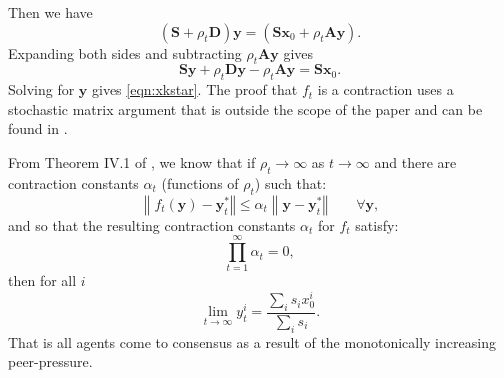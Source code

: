 \documentclass[aps,superscriptaddress,floatfix,amsmath,amssymb]{revtex4-2}
\newcommand\norm[1]{\left\lVert#1\right\Vert}
\begin{document}
Then we have
\begin{equation*}
\left(\mathbf{S} + \rho_t\mathbf{D}\right)\mathbf{y} = \left(\mathbf{S}\mathbf{x}_0 + \rho_t\mathbf{A}\mathbf{y}\right).
\end{equation*}
Expanding both sides and subtracting $\rho_t\mathbf{A}\mathbf{y}$ gives
\begin{equation*}
\mathbf{S}\mathbf{y} + \rho_t\mathbf{D}\mathbf{y} - \rho_t\mathbf{A}\mathbf{y} = \mathbf{S}\mathbf{x}_0.
\end{equation*}
Solving for $\mathbf{y}$ gives \cref{eqn:xkstar}. The proof that $f_t$ is a contraction uses a stochastic matrix argument that is outside the scope of the paper and can be found in \cite{SGSR18}.

From Theorem IV.1 of \cite{SGSR18}, we know that if $\rho_t \to \infty$ as $t \to \infty$ and there are contraction constants $\alpha_t$ (functions of $\rho_t$) such that:
\begin{displaymath}
\norm{f_t(\mathbf{y}) - \mathbf{y}^*_t} \leq \alpha_t \norm{\mathbf{y} - \mathbf{y}_t^*} \qquad \forall \mathbf{y},
\end{displaymath}
and so that the resulting contraction constants $\alpha_t$ for $f_t$ satisfy:
\begin{displaymath}
\prod_{t=1}^\infty \alpha_t = 0,
\end{displaymath}
then for all $i$
\begin{displaymath}
\lim_{t \to \infty} y^i_t = \frac{\sum_i s_ix^i_{0}}{\sum_i s_i}.
\end{displaymath}
That is all agents come to consensus as a result of the monotonically increasing peer-pressure.
\end{document}
